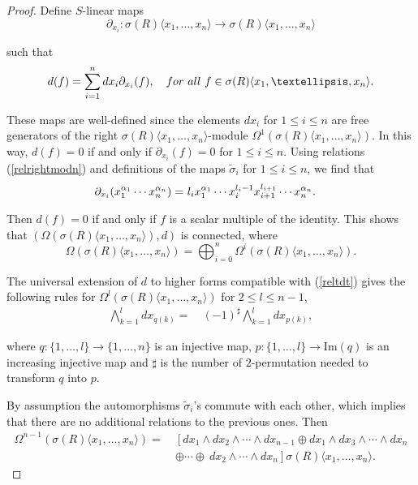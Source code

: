 \documentclass{amsart}
\theoremstyle{definition}
\theoremstyle{remark}
\numberwithin{equation}{section}
\begin{document}
\begin{proof}
Define $S$-linear maps 
$$
\partial_{x_i}: \sigma(R)\langle x_1,\ldots, x_n\rangle \rightarrow \sigma(R)\langle x_1,\ldots, x_n\rangle
$$ 

such that
\begin{align*}
    d(f) = \sum_{i=1}^{n}dx_i \partial_{x_i}(f), \quad {\rm for\ all}\ f \in \sigma(R)\langle x_1,\ldots, x_n\rangle.
\end{align*}

These maps are well-defined since the elements $dx_i$ for $1\leq i \leq n$ are free generators of the right $\sigma(R)\langle x_1,\ldots, x_n\rangle$-module $\Omega^1(\sigma(R)\langle x_1,\ldots, x_n\rangle)$. In this way, $d(f) = 0$ if and only if $\partial_{x_i}(f) = 0$ for $1 \leq i \leq n$. Using relations {\rm (}\ref{relrightmodn}{\rm )} and definitions of the maps $\widetilde{\sigma}_{i}$ for $1 \leq i \leq n$, we find that
\begin{align}
    \partial_{x_i}(x_1^{\alpha_{1}}\cdots x_n^{\alpha_{n}}) = &\ l_{i}x_{1}^{\alpha_{1}}\cdots x_i^{l_i-1}x_{i+1}^{l_{i+1}}\cdots x_n^{\alpha_{n}}. \notag
\end{align}

Then $d(f) = 0$ if and only if $f$ is a scalar multiple of the identity. This shows that $(\Omega(\sigma(R)\langle x_1,\ldots, x_n\rangle), d)$ is connected, where 
\[
\Omega (\sigma(R)\langle x_1,\ldots, x_n\rangle) = \bigoplus_{i=0}^{n}\Omega^i\left(\sigma(R)\langle x_1,\ldots, x_n\rangle\right).
\]

The universal extension of $d$ to higher forms compatible with {\rm (}\ref{reltdt}{\rm )} gives the following rules for $\Omega^l(\sigma(R)\langle x_1,\ldots, x_n\rangle)$ for $2 \le l \leq n-1$, 
\begin{align}\label{relnwedge}
    \bigwedge_{k=1}^{l}dx_{q(k)} = &\ (-1)^{\sharp}\bigwedge_{k=1}^ldx_{p(k)}, 
\end{align}

where $q:\{1,\ldots,l\}\rightarrow \{1,\ldots,n\}$ is an injective map, $p:\{1,\ldots,l\}\rightarrow \text{Im}(q)$ is an increasing injective map and $\sharp$ is the number of $2$-permutation needed to transform $q$ into $p$.

By assumption the automorphisms $\widetilde{\sigma}_{i}$'s commute with each other, which implies that there are no additional relations to the previous ones. Then
\begin{align*}
 \Omega^{n-1}(\sigma(R)\langle x_1,\ldots, x_n\rangle) = &\ \left[dx_1\wedge dx_2\wedge \cdots \wedge dx_{n-1}\oplus dx_1\wedge dx_3\wedge \cdots \wedge dx_{n} \right. \\
    &\ \left. \oplus \cdots \oplus \ dx_2\wedge \cdots \wedge dx_{n}\right]\sigma(R)\langle x_1,\ldots, x_n\rangle. 
\end{align*}


\end{proof}
\end{document}
